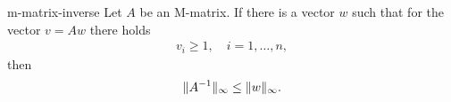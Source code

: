 \begin{Lemma}{m-matrix-inverse}
  Let $A$ be an M-matrix. If there is a vector $w$ such that for
  the vector $v=Aw$ there holds
  \begin{gather*}
    v_i \ge 1, \quad i=1,\dots,n,
  \end{gather*}
  then
  \begin{gather}
    \label{eq:fd:4}
    \lVert A^{-1}\rVert_\infty \le \lVert w\rVert_\infty.
  \end{gather}
\end{Lemma}

